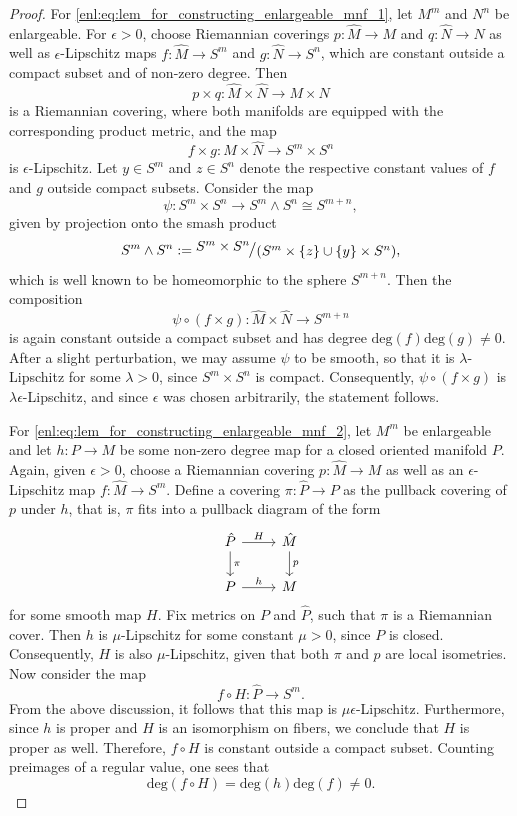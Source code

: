 \begin{proof}
    For \ref{enl:eq:lem_for_constructing_enlargeable_mnf_1}, let $M^m$ and $N^n$ be enlargeable. For $\epsilon > 0$, choose Riemannian coverings $p \colon \hat{M} \to M$ and $q \colon \hat{N} \to N$ as well as $\epsilon$-Lipschitz maps $f \colon \hat{M} \to S^m$ and $g \colon \hat{N} \to S^n$, which are constant outside a compact subset and of non-zero degree. Then 
    \[
    p \times q \colon \hat{M} \times \hat{N} \to M \times N
    \]
    is a Riemannian covering, where both manifolds are equipped with the corresponding product metric, and the map
    \[
    f \times g \colon \hat{M} \times \hat{N} \to S^m \times S^n
    \]
    is $\epsilon$-Lipschitz. Let $y \in S^m$ and $z \in S^n$ denote the respective constant values of $f$ and $g$ outside compact subsets. Consider the map 
    \[
    \psi \colon S^m \times S^n \to S^m \wedge S^n \cong S^{m+n},
    \]
    given by projection onto the smash product 
    \[
    S^m \wedge S^n := \raisebox{3pt}{$\modulo{S^m \times S^n}{(S^m \times \{z\} \cup \{y\} \times S^n)}$},
    \]
    which is well known to be homeomorphic to the sphere $S^{m+n}$. Then the composition 
    \[
    \psi \circ (f \times g) \colon \hat{M} \times \hat{N} \to S^{m+n}
    \] 
    is again constant outside a compact subset and has degree $\mathrm{deg}(f) \mathrm{deg}(g) \neq 0$. After a slight perturbation, we may assume $\psi$ to be smooth, so that it is $\lambda$-Lipschitz for some $\lambda > 0$, since $S^m \times S^n$ is compact. Consequently, $\psi \circ (f \times g)$ is $\lambda \epsilon$-Lipschitz, and since $\epsilon$ was chosen arbitrarily, the statement follows.

    For \ref{enl:eq:lem_for_constructing_enlargeable_mnf_2}, let $M^m$ be enlargeable and let $h \colon P \to M$ be some non-zero degree map for a closed oriented manifold $P$. Again, given $\epsilon > 0$, choose a Riemannian covering $p \colon \hat{M} \to M$ as well as an $\epsilon$-Lipschitz map $f \colon \hat{M} \to S^m$. Define a covering $\pi \colon \hat{P} \to P$ as the pullback covering of $p$ under $h$, that is, $\pi$ fits into a pullback diagram of the form 
    \[\begin{tikzcd}
	{\hat{P}} & {\hat{M}} \\
	P & M
	\arrow["H", from=1-1, to=1-2]
	\arrow["\pi", from=1-1, to=2-1]
	\arrow["p", from=1-2, to=2-2]
	\arrow["h", from=2-1, to=2-2]
    \end{tikzcd}\]
    for some smooth map $H$. Fix metrics on $P$ and $\hat{P}$, such that $\pi$ is a Riemannian cover. Then $h$ is $\mu$-Lipschitz for some constant $\mu > 0$, since $P$ is closed. Consequently, $H$ is also $\mu$-Lipschitz, given that both $\pi$ and $p$ are local isometries. Now consider the map 
    \[
    f \circ H \colon \hat{P} \to S^m.
    \] 
    From the above discussion, it follows that this map is $\mu \epsilon$-Lipschitz. Furthermore, since $h$ is proper and $H$ is an isomorphism on fibers, we conclude that $H$ is proper as well. Therefore, $f \circ H$ is constant outside a compact subset. Counting preimages of a regular value, one sees that 
    \[
    \mathrm{deg}(f \circ H) = \mathrm{deg}(h) \mathrm{deg}(f) \neq 0.
    \]
\end{proof}

